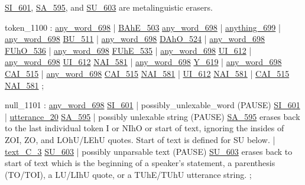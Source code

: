    \hyperref[html:y601]{SI_601}, \hyperref[html:y595]{SA_595}, and \hyperref[html:y603]{SU_603} are metalinguistic erasers.

\label{html:y1100}
token_1100              :  \hyperref[html:y698]{any_word_698}
                        |  \hyperref[html:y503]{BAhE_503}  \hyperref[html:y698]{any_word_698}
                        |  \hyperref[html:y699]{anything_699}
                        |  \hyperref[html:y698]{any_word_698}  \hyperref[html:y511]{BU_511}
                        |  \hyperref[html:y698]{any_word_698}  \hyperref[html:y524]{DAhO_524}
                        |  \hyperref[html:y698]{any_word_698}  \hyperref[html:y536]{FUhO_536}
                        |  \hyperref[html:y698]{any_word_698}  \hyperref[html:y535]{FUhE_535}
                        |  \hyperref[html:y698]{any_word_698}  \hyperref[html:y612]{UI_612}
                        |  \hyperref[html:y698]{any_word_698}  \hyperref[html:y612]{UI_612}  \hyperref[html:y581]{NAI_581}
                        |  \hyperref[html:y698]{any_word_698}  \hyperref[html:y619]{Y_619}
                        |  \hyperref[html:y698]{any_word_698}  \hyperref[html:y515]{CAI_515}
                        |  \hyperref[html:y698]{any_word_698}  \hyperref[html:y515]{CAI_515}  \hyperref[html:y581]{NAI_581}
                        |  \hyperref[html:y612]{UI_612}  \hyperref[html:y581]{NAI_581}
                        |  \hyperref[html:y515]{CAI_515}  \hyperref[html:y581]{NAI_581}
                        ;

\label{html:y1101}
null_1101               :  \hyperref[html:y698]{any_word_698}  \hyperref[html:y601]{SI_601}
                        |  possibly_unlexable_word  (PAUSE)  \hyperref[html:y601]{SI_601}
                        |  \hyperref[html:y20]{utterance_20}  \hyperref[html:y595]{SA_595}
                        |  possibly unlexable string  (PAUSE)  \hyperref[html:y595]{SA_595}
                           erases back to the last individual token
                           I or NIhO or start of text, ignoring the
                           insides of ZOI, ZO, and LOhU/LEhU quotes.
                           Start of text is defined for SU below.
                        |  \hyperref[html:y3]{text_C_3}  \hyperref[html:y603]{SU_603}
                        |  possibly unparsable text  (PAUSE)  \hyperref[html:y603]{SU_603}
                           erases back to start of text which is the
                           beginning of a speaker's statement,
                           a parenthesis (TO/TOI), a LU/LIhU quote,
                           or a TUhE/TUhU utterance string.
                        ;

